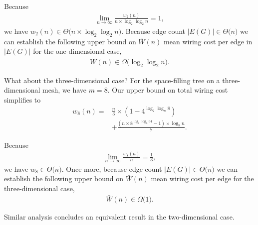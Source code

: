 Because
\begin{align*}
\lim_{n \rightarrow \infty}
\frac{
  w_2(n)
}{
  n \times \log_2 \log_2 n
}
= 1,
\end{align*}
we have $w_2(n) \in \Theta \Big( n \times \log_2 \log_2 n \Big)$.
Because edge count $|E(G)| \in \Theta \Big( n \Big)$ we can establish the following upper bound on $\bar{W}(n)$ mean wiring cost per edge in $|E(G)|$ for the one-dimensional case,
\begin{align*}
\bar{W}(n) \in \Omega\Big( \log_2 \log_2 n \Big).
\end{align*}

What about the three-dimensional case?
For the space-filling tree on a three-dimensional mesh, we have $m = 8$.
Our upper bound on total wiring cost simplifies to
\begin{align*}
w_8(n)
=&
\frac{n}{3}
\times (1 - 4^{ \log_2 \log_n 8 }) \\
&+
\frac{
  (
    n \times 8^{
      \log_2 \log_n 64
    } - 1
  ) \times \log_8 n
}{7}.
\end{align*}

Because
\begin{align*}
\lim_{n \rightarrow \infty}
\frac{
  w_8(n)
}{
  n
}
= \frac{1}{3},
\end{align*}
we have $w_8 \in \Theta \Big( n \Big)$.
Once more, because edge count $|E(G)| \in \Theta \Big( n \Big)$ we can establish the following upper bound on $\bar{W}(n)$ mean wiring cost per edge for the three-dimensional case,
\begin{align*}
\bar{W}(n) \in \Omega \Big( 1 \Big).
\end{align*}

%

Similar analysis concludes an equivalent result in the two-dimensional case.

%
%
